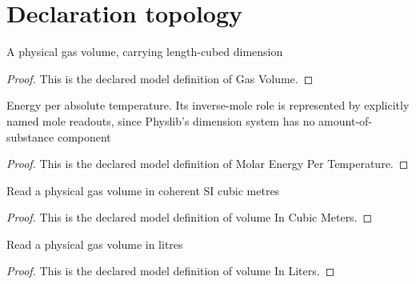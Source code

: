 \section{Declaration topology}
\begin{definition}
  \label{def:physics:phyx-mini-0472:phyxminiproblems-problemphyxmini0472-gasvolume}
  A physical gas volume, carrying length-cubed dimension
\end{definition}
\begin{proof}
  This is the declared model definition of Gas Volume.
\end{proof}
\begin{definition}
  \label{def:physics:phyx-mini-0472:phyxminiproblems-problemphyxmini0472-molarenergypertemperature}
  Energy per absolute temperature. Its inverse-mole role is represented by explicitly named mole readouts, since Physlib's dimension system has no amount-of-substance component
\end{definition}
\begin{proof}
  This is the declared model definition of Molar Energy Per Temperature.
\end{proof}
\begin{definition}
  \label{def:physics:phyx-mini-0472:phyxminiproblems-problemphyxmini0472-volumeincubicmeters}
  Read a physical gas volume in coherent SI cubic metres
\end{definition}
\begin{proof}
  This is the declared model definition of volume In Cubic Meters.
\end{proof}
\begin{definition}
  \label{def:physics:phyx-mini-0472:phyxminiproblems-problemphyxmini0472-volumeinliters}
  Read a physical gas volume in litres
\end{definition}
\begin{proof}
  This is the declared model definition of volume In Liters.
\end{proof}
